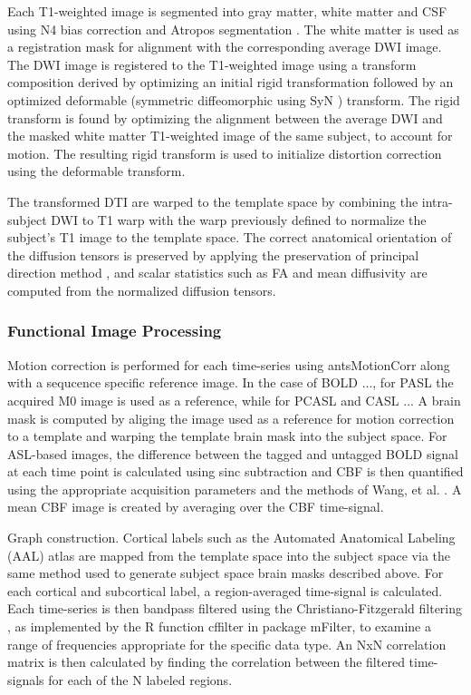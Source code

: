 Each T1-weighted image is segmented into gray matter, white matter and CSF using N4 bias correction \cite{Tustison2010} and Atropos segmentation \cite{Avants2011a}. The white matter is used as a registration mask for alignment with the corresponding average DWI image. The DWI image is registered to the T1-weighted image using a transform composition derived by optimizing an initial rigid transformation followed by an optimized deformable (symmetric diffeomorphic using SyN \cite{Avants2011}) transform. The rigid transform is found by optimizing the alignment between the average DWI and the masked white matter T1-weighted image of the same subject, to account for motion. The resulting rigid transform is used to initialize distortion correction using the deformable transform.

The transformed DTI are warped to the template space by combining the intra-subject DWI to T1 warp with the warp previously defined to normalize the subject's T1 image to the template space. The correct anatomical orientation of the diffusion tensors is preserved by applying the preservation of principal direction method \cite{Alexander2001}, and scalar statistics such as FA and mean diffusivity are computed from the normalized diffusion tensors.


\subsubsection{Functional Image Processing}

Motion correction is performed for each time-series using
antsMotionCorr along with a sequcence specific reference image. In
the case of BOLD ..., for PASL the acquired M0 image is used as a
reference, while for PCASL and CASL ... A brain mask is computed by
aliging the image used as a reference for motion correction to a
template and warping the template brain mask into the subject
space. For ASL-based images, the difference between the tagged and
untagged BOLD signal at each time point is calculated using sinc subtraction \cite{Aguirre2002} and CBF is
then quantified using the appropriate acquisition parameters and the
methods of Wang, et al. \cite{Wang2003b}. A mean CBF image is created by
averaging over the CBF time-signal. 

Graph construction. Cortical labels such as the Automated Anatomical
Labeling (AAL) atlas \cite{Tzourio-Mazoyer2002} are mapped from
the template space into the subject space via the same method used to
generate subject space brain masks described above. For each cortical
and subcortical label, a region-averaged time-signal is
calculated. Each time-series is then bandpass filtered using the
Christiano-Fitzgerald filtering \cite{Christiano1999}, as
implemented by the R function cffilter in package mFilter, to examine
a range of frequencies appropriate for the specific data type. An NxN
correlation matrix is then calculated by finding the correlation
between the filtered time-signals for each of the N labeled regions.

